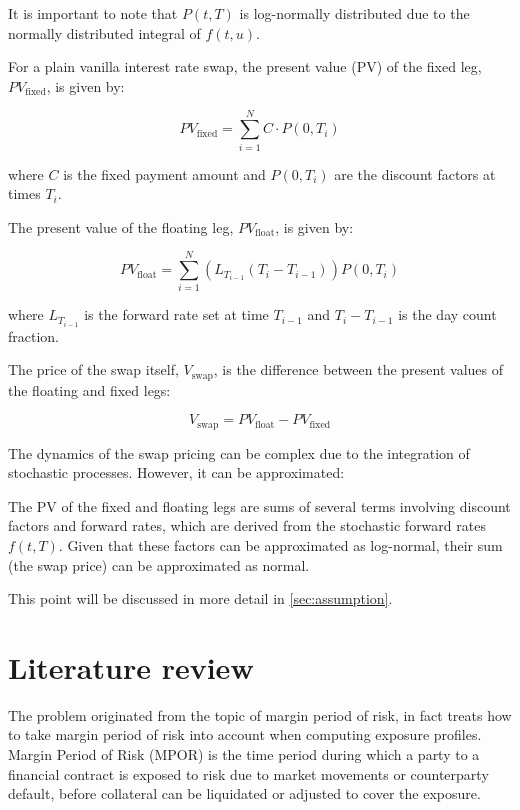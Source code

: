 \documentclass{article}
\begin{document}
It is important to note that \(P(t,T)\) is log-normally distributed due to the normally distributed integral of \(f(t,u)\).

For a plain vanilla interest rate swap, the present value (PV) of the fixed leg, \(PV_{\text{fixed}}\), is given by:

\[
PV_{\text{fixed}} = \sum_{i=1}^{N} C \cdot P(0,T_i)
\]

where \(C\) is the fixed payment amount and \(P(0,T_i)\) are the discount factors at times \(T_i\).

The present value of the floating leg, \(PV_{\text{float}}\), is given by:

\[
PV_{\text{float}} = \sum_{i=1}^{N} \left( L_{T_{i-1}}(T_i - T_{i-1}) \right) P(0,T_i)
\]

where \(L_{T_{i-1}}\) is the forward rate set at time \(T_{i-1}\) and $T_i - T_{i-1}$ is the day count fraction.

The price of the swap itself, \(V_{\text{swap}}\), is the difference between the present values of the floating and fixed legs:

\[
V_{\text{swap}} = PV_{\text{float}} - PV_{\text{fixed}}
\]

The dynamics of the swap pricing can be complex due to the integration of stochastic processes. However, it can be approximated:

The PV of the fixed and floating legs are sums of several terms involving discount factors and forward rates, which are derived from the stochastic forward rates \(f(t,T)\). Given that these factors can be approximated as log-normal, their sum (the swap price) can be approximated as normal.

This point will be discussed in more detail in \cref{sec:assumption}.

\section{Literature review}

The problem originated from the topic of margin period of risk, in fact \cite{andersen2016rethinking} treats how to take margin period of risk into account when computing exposure profiles. 
Margin Period of Risk (MPOR) is the time period during which a party to a financial contract is exposed to risk due to market movements or counterparty default, before collateral can be liquidated or adjusted to cover the exposure.
\end{document}
